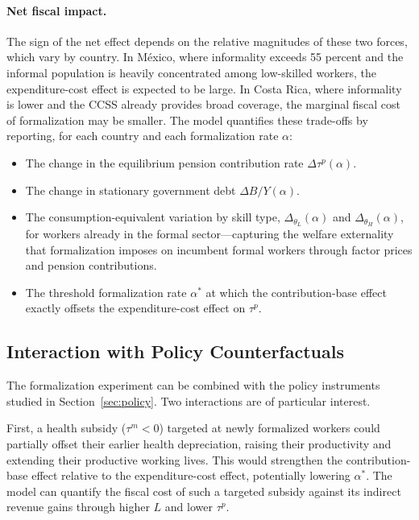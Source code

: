 \documentclass[12pt,a4paper]{article}
\begin{document}
\paragraph{Net fiscal impact.} The sign of the net effect depends on the relative magnitudes of these two forces, which vary by country. In M\'exico, where informality exceeds 55 percent and the informal population is heavily concentrated among low-skilled workers, the expenditure-cost effect is expected to be large. In Costa Rica, where informality is lower and the CCSS already provides broad coverage, the marginal fiscal cost of formalization may be smaller. The model quantifies these trade-offs by reporting, for each country and each formalization rate $\alpha$:

\begin{itemize}
    \item The change in the equilibrium pension contribution rate $\Delta \tau^p(\alpha)$.
    \item The change in stationary government debt $\Delta B/Y(\alpha)$.
    \item The consumption-equivalent variation by skill type, $\Delta_{\theta_L}(\alpha)$ and $\Delta_{\theta_H}(\alpha)$, for workers already in the formal sector---capturing the welfare externality that formalization imposes on incumbent formal workers through factor prices and pension contributions.
    \item The threshold formalization rate $\alpha^*$ at which the contribution-base effect exactly offsets the expenditure-cost effect on $\tau^p$.
\end{itemize}

\subsection{Interaction with Policy Counterfactuals}
\label{subsec:form_interaction}

The formalization experiment can be combined with the policy instruments studied in Section~\ref{sec:policy}. Two interactions are of particular interest.

First, a health subsidy ($\tau^m < 0$) targeted at newly formalized workers could partially offset their earlier health depreciation, raising their productivity and extending their productive working lives. This would strengthen the contribution-base effect relative to the expenditure-cost effect, potentially lowering $\alpha^*$. The model can quantify the fiscal cost of such a targeted subsidy against its indirect revenue gains through higher $L$ and lower $\tau^p$.
\end{document}
